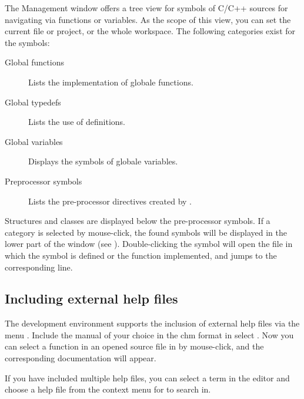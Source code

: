 The \codeblocks Management window offers a tree view for symbols of C/C++ sources for navigating via functions or variables. As the scope of this view, you can set the current file or project, or the whole workspace. The following categories exist for the symbols:


\begin{description}
\item[Global functions] Lists the implementation of globale functions.
\item[Global typedefs] Lists the use of  definitions.
\item[Global variables] Displays the symbols of globale variables.
\item[Preprocessor symbols] Lists the pre-processor directives created by .
\end{description}

Structures and classes are displayed below the pre-processor symbols. If a category is selected by mouse-click, the found symbols will be displayed in the lower part of the window (see ). Double-clicking the symbol will open the file in which the symbol is defined or the function implemented, and jumps to the corresponding line.


\subsection{Including external help files}

The \codeblocks development environment supports the inclusion of external help files via the menu . Include the manual of your choice in the chm format in  select . Now you can select a function in an opened source file in \codeblocks by mouse-click, and the corresponding documentation will appear.

If you have included multiple help files, you can select a term in the editor and choose a help file from the context menu  for \codeblocks to search in.


